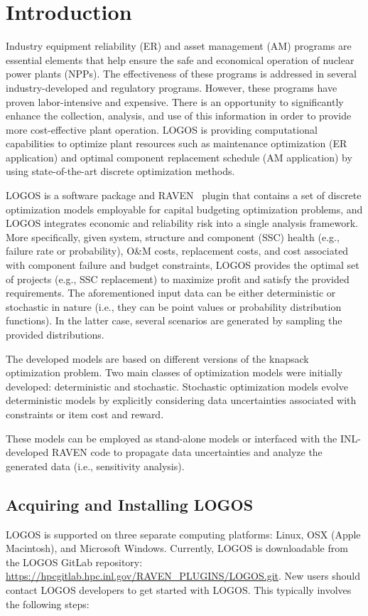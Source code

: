 \section{Introduction}
\label{sec:Introduction}

Industry equipment reliability (ER) and asset management (AM) programs are essential elements that
help ensure the safe and economical operation of nuclear power plants (NPPs). The effectiveness of
these programs is addressed in several industry-developed and regulatory programs. However, these
programs have proven labor-intensive and expensive. There is an opportunity to significantly
enhance the collection, analysis, and use of this information in order to provide more cost-effective plant
operation. LOGOS is providing computational capabilities to optimize plant resources such as
maintenance optimization (ER application) and optimal component replacement schedule (AM application)
by using state-of-the-art discrete optimization methods.

LOGOS is a software package and RAVEN~\cite{RAVEN,RAVENtheoryMan} plugin that
contains a set of discrete optimization models employable for capital budgeting optimization
problems, and LOGOS integrates economic and reliability
risk into a single analysis framework. More specifically,  given system, structure and component
(SSC) health (e.g., failure rate or probability), O\&M costs, replacement costs, and cost
associated with component failure and budget constraints, LOGOS provides the optimal set of projects
(e.g., SSC replacement) to maximize profit and satisfy the provided requirements.
The aforementioned input data can be either deterministic or stochastic in nature (i.e., they can be point values
or probability distribution functions). In the latter case, several scenarios are generated by
sampling the provided distributions.

The developed models are based on different versions of the knapsack optimization problem.
Two main classes of optimization models were initially developed: deterministic and stochastic.
Stochastic optimization models evolve deterministic models by explicitly considering data
uncertainties associated with constraints or item cost and reward.

These models can be employed as stand-alone models or interfaced with the INL-developed RAVEN code
to propagate data uncertainties and analyze the generated data (i.e., sensitivity analysis).

\subsection{Acquiring and Installing LOGOS}
LOGOS is supported on three separate computing platforms: Linux, OSX (Apple Macintosh), and Microsoft
Windows. Currently, LOGOS is downloadable from the LOGOS GitLab repository:
\url{https://hpcgitlab.hpc.inl.gov/RAVEN_PLUGINS/LOGOS.git}. New users should contact LOGOS developers to
get started with LOGOS. This typically involves the following steps:

